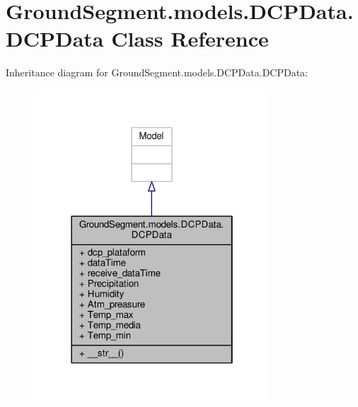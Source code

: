 \hypertarget{class_ground_segment_1_1models_1_1_d_c_p_data_1_1_d_c_p_data}{}\section{Ground\+Segment.\+models.\+D\+C\+P\+Data.\+D\+C\+P\+Data Class Reference}
\label{class_ground_segment_1_1models_1_1_d_c_p_data_1_1_d_c_p_data}


Inheritance diagram for Ground\+Segment.\+models.\+D\+C\+P\+Data.\+D\+C\+P\+Data\+:\nopagebreak
\begin{figure}[H]
\begin{center}
\leavevmode
\includegraphics[width=250pt]{class_ground_segment_1_1models_1_1_d_c_p_data_1_1_d_c_p_data__inherit__graph}
\end{center}
\end{figure}


